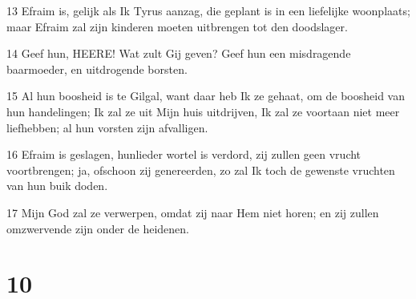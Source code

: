 \par 13 Efraim is, gelijk als Ik Tyrus aanzag, die geplant is in een liefelijke woonplaats; maar Efraim zal zijn kinderen moeten uitbrengen tot den doodslager.
\par 14 Geef hun, HEERE! Wat zult Gij geven? Geef hun een misdragende baarmoeder, en uitdrogende borsten.
\par 15 Al hun boosheid is te Gilgal, want daar heb Ik ze gehaat, om de boosheid van hun handelingen; Ik zal ze uit Mijn huis uitdrijven, Ik zal ze voortaan niet meer liefhebben; al hun vorsten zijn afvalligen.
\par 16 Efraim is geslagen, hunlieder wortel is verdord, zij zullen geen vrucht voortbrengen; ja, ofschoon zij genereerden, zo zal Ik toch de gewenste vruchten van hun buik doden.
\par 17 Mijn God zal ze verwerpen, omdat zij naar Hem niet horen; en zij zullen omzwervende zijn onder de heidenen.

\chapter{10}

